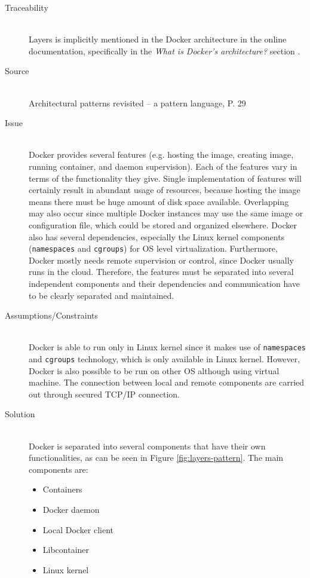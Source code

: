 \begin{description}
\item [Traceability]~\\
Layers is implicitly mentioned in the Docker architecture in the online
documentation, specifically in the \textit{What is Docker’s architecture?}
section \cite{dockerarchi}.

\item [Source]~\\
Architectural patterns revisited -- a pattern language, P. 29
\cite{avgeriou2005architectural}

\item [Issue]~\\
Docker provides several features (e.g. hosting the image, creating image, running container, and daemon supervision). Each of the features vary in terms of the functionality they give. Single implementation of features will certainly result in abundant usage of resources, because hosting the image means there must be huge amount of disk space available.
%
Overlapping may also occur since multiple Docker instances may use the same image or configuration file, which could be stored and organized elsewhere. Docker also has several dependencies, especially the Linux kernel components (\texttt{namespaces} and \texttt{cgroups}) for OS level virtualization.
Furthermore, Docker mostly needs remote supervision or control, since Docker usually runs in the cloud. Therefore, the features must be separated into several independent components and their dependencies and communication have to be clearly separated and maintained.

\item [Assumptions/Constraints]~\\
Docker is able to run only in Linux kernel since it makes use of
\texttt{namespaces} and \texttt{cgroups} technology, which is only available in
Linux kernel. However, Docker is also possible to be run on other OS
although using virtual machine. The connection between local and remote
components are carried out through secured TCP/IP connection.

\item [Solution]~\\
Docker is separated into several components that have their own
functionalities, as can be seen in Figure \ref{fig:layers-pattern}. The main components are:
\begin{itemize}
    \item Containers
    \item Docker daemon
    \item Local Docker client
    \item Libcontainer
    \item Linux kernel
\end{itemize}


\end{description}
